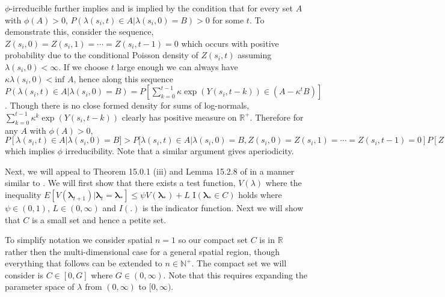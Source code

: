 \documentclass[11pt]{isuthesis}
\begin{document}
$\phi$-irreducible further implies and is implied by the condition that for every set $A$ with $\phi(A)>0$, $P(\lambda(s_i,t)\in A|\lambda(s_i,0)=B)>0$ for some $t$.  
To demonstrate this, consider the sequence, $Z(s_i,0)=Z(s_i,1)=\cdots=Z(s_i,t-1)=0$ which occurs with positive probability due to the conditional Poisson density of $Z(s_i,t)$ assuming $\lambda(s_i,0)<\infty$.  If we choose $t$ large enough we can always have $\kappa\lambda(s_i,0) < \mbox{inf } A$, hence along this sequence $P(\lambda(s_i,t)\in A|\lambda(s_i,0)=B)= P[\sum_{k=0}^{t-1} \kappa\exp(Y(s_i,t-k))\in (A-\kappa^t B)]$.  Though there is no close formed density for sums of log-normals, $\sum_{k=0}^{t-1} \kappa^k\exp(Y(s_i,t-k))$ clearly has positive measure on $\mathbb{R}^{+}$.  Therefore for any $A$ with $\phi(A)>0$, $P[\lambda(s_i,t)\in A|\lambda(s_i,0)=B]>P[\lambda(s_i,t)\in A|\lambda(s_i,0)=B,Z(s_i,0)=Z(s_i,1)=\cdots=Z(s_i,t-1)=0]P[Z(s_i,0)=Z(s_i,1)=\cdots=Z(s_i,t-1)=0]|\lambda(s_i,0)=B>0$ which implies $\phi$ irreducibility.  Note that a similar argument gives aperiodicity.

Next, we will appeal to Theorem 15.0.1 (iii) and Lemma 15.2.8 of \cite{meyn2012markov} in a manner similar to \cite{fokianos2009poisson}. We will first show that there exists a test function, $V(\lambda)$ where the inequality $E[V(\boldsymbol{\lambda}_{t+1})|\boldsymbol{\lambda}_t=\boldsymbol{\lambda_*}]\leq \psi V(\boldsymbol{\lambda_*})+L \mbox{ I}(\boldsymbol{\lambda_*} \in C)$ holds where $\psi \in (0,1)$, $L \in (0,\infty)$ and $I(.)$ is the indicator function.  Next we will show that $C$ is a small set and hence a petite set.

To simplify notation we consider spatial $n=1$ so our compact set $C$ is in $\mathbb{R}$ rather then the multi-dimensional case for a general spatial region, though everything that follows can be extended to $n\in\mathbb{N}^+$.  The compact set we will consider is $C \in [0,G]$ where  $G \in (0,\infty)$.  Note that this requires expanding the parameter space of $\lambda$ from $(0,\infty)$ to $[0,\infty)$.
\end{document}
